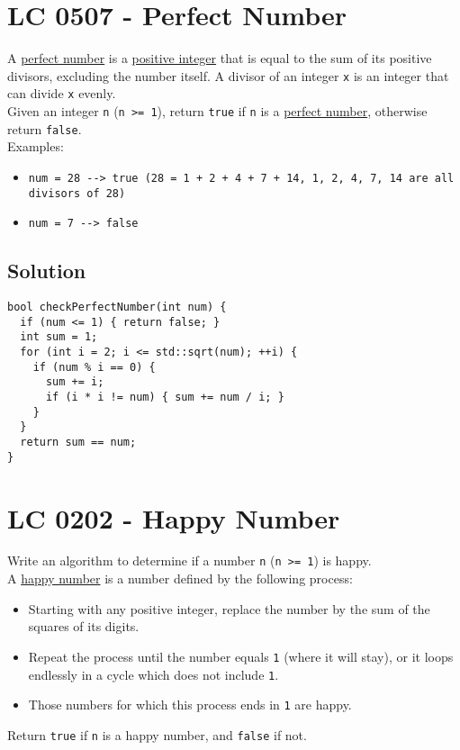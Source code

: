 \section{LC 0507 - Perfect Number}
A \ul{perfect number} is a \ul{positive integer} that is equal to the sum of its positive divisors, excluding the number itself. A divisor of an integer {\colorbox{CodeBackground}{\lstinline|x|}} is an integer that can divide {\colorbox{CodeBackground}{\lstinline|x|}} evenly.\\

Given an integer {\colorbox{CodeBackground}{\lstinline|n|}} ({\colorbox{CodeBackground}{\lstinline|n >= 1|}}), return {\colorbox{CodeBackground}{\lstinline|true|}} if {\colorbox{CodeBackground}{\lstinline|n|}} is a \ul{perfect number}, otherwise return {\colorbox{CodeBackground}{\lstinline|false|}}.\\

Examples:
\begin{itemize}
\item {\colorbox{CodeBackground}{\lstinline|num = 28 --> true (28 = 1 + 2 + 4 + 7 + 14, 1, 2, 4, 7, 14 are all divisors of 28)|}}
\item {\colorbox{CodeBackground}{\lstinline|num = 7 --> false|}}
\end{itemize}

\subsection*{Solution}
\begin{lstlisting}
bool checkPerfectNumber(int num) {
  if (num <= 1) { return false; }
  int sum = 1;
  for (int i = 2; i <= std::sqrt(num); ++i) {
    if (num % i == 0) {
      sum += i;
      if (i * i != num) { sum += num / i; }
    }
  }
  return sum == num;
}
\end{lstlisting}

\section{LC 0202 - Happy Number}\label{lc0202}
Write an algorithm to determine if a number {\colorbox{CodeBackground}{\lstinline|n|}} ({\colorbox{CodeBackground}{\lstinline|n >= 1|}}) is happy.\\

A \ul{happy number} is a number defined by the following process:
\begin{itemize}
	\item Starting with any positive integer, replace the number by the sum of the squares of its digits.
	\item Repeat the process until the number equals {\colorbox{CodeBackground}{\lstinline|1|}} (where it will stay), or it loops endlessly in a cycle which does not include {\colorbox{CodeBackground}{\lstinline|1|}}.
	\item Those numbers for which this process ends in {\colorbox{CodeBackground}{\lstinline|1|}} are happy.
\end{itemize}
Return {\colorbox{CodeBackground}{\lstinline|true|}} if {\colorbox{CodeBackground}{\lstinline|n|}} is a happy number, and {\colorbox{CodeBackground}{\lstinline|false|}} if not.\\

